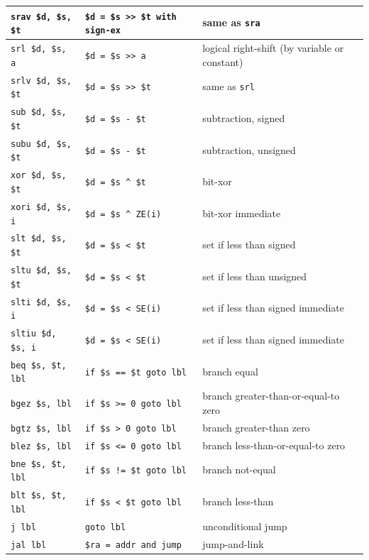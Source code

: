 \documentclass[12pt]{article}
\begin{document}
\begin{longtable}{l || l | l}
    \texttt{srav  \$d, \$s, \$t} & \texttt{\$d = \$s >> \$t with sign-ex} & same as \texttt{sra}\\ \hline
    \texttt{srl   \$d, \$s, a} & \texttt{\$d = \$s >> a} & logical right-shift (by variable or constant)\\ \hline
    \texttt{srlv  \$d, \$s, \$t} & \texttt{\$d = \$s >> \$t} & same as \texttt{srl}\\ \hline
    \texttt{sub   \$d, \$s, \$t} & \texttt{\$d = \$s - \$t} & subtraction, signed\\ \hline
    \texttt{subu  \$d, \$s, \$t} & \texttt{\$d = \$s - \$t} & subtraction, unsigned\\ \hline
    \texttt{xor   \$d, \$s, \$t} & \texttt{\$d = \$s \^{} \$t} & bit-xor\\ \hline
    \texttt{xori  \$d, \$s, i} & \texttt{\$d = \$s \^{} ZE(i)} & bit-xor immediate\\
    \hhline{=#=|=}
    \texttt{slt   \$d, \$s, \$t} & \texttt{\$d = \$s < \$t} & set if less than signed\\ \hline
    \texttt{sltu  \$d, \$s, \$t} & \texttt{\$d = \$s < \$t} & set if less than unsigned\\ \hline
    \texttt{slti  \$d, \$s, i} & \texttt{\$d = \$s < SE(i)} & set if less than signed immediate\\ \hline
    \texttt{sltiu \$d, \$s, i} & \texttt{\$d = \$s < SE(i)} & set if less than signed immediate\\
    \hhline{=#=|=}
    \texttt{beq   \$s, \$t, lbl} & \texttt{if \$s == \$t goto lbl} & branch equal\\ \hline
    \texttt{bgez  \$s, lbl} & \texttt{if \$s >= 0 goto lbl} & branch greater-than-or-equal-to zero\\ \hline
    \texttt{bgtz  \$s, lbl} & \texttt{if \$s > 0 goto lbl} & branch greater-than zero\\ \hline
    \texttt{blez  \$s, lbl} & \texttt{if \$s <= 0 goto lbl} & branch less-than-or-equal-to zero\\ \hline
    \texttt{bne   \$s, \$t, lbl} & \texttt{if \$s != \$t goto lbl} & branch not-equal\\ \hline
    \texttt{blt   \$s, \$t, lbl} & \texttt{if \$s < \$t goto lbl} & branch less-than\\
    \hhline{=#=|=}
    \texttt{j     lbl} & \texttt{goto lbl} & unconditional jump\\ \hline
    \texttt{jal   lbl} & \texttt{\$ra = addr and jump} & jump-and-link\\ \hline

\end{longtable}
\end{document}
